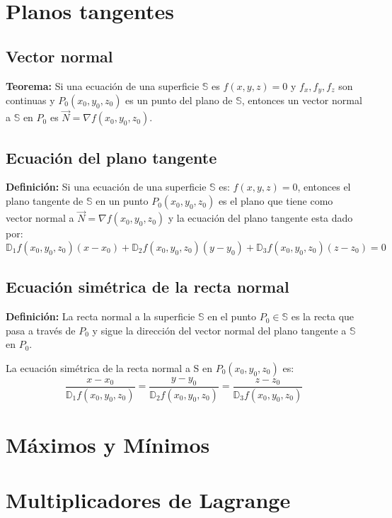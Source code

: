 \documentclass[../main]{subfiles}
\begin{document}
\chapter{Planos tangentes}
\section{Vector normal}
\textbf{Teorema:} Si una ecuación de una superficie $\mathbb{S}$ es $f(x,y,z)=0$ y $f_x,f_y,f_z$ son continuas y $P_0 (x_0,y_0,z_0)$ es un punto del plano de $\mathbb{S}$, entonces un vector normal a $\mathbb{S}$ en $P_0$ es $\vec{N}= \nabla f(x_0,y_0,z_0)$.
\section{Ecuación del plano tangente}
\textbf{Definición:} Si una ecuación de una superficie $\mathbb{S}$ es: $f(x,y,z)=0$, entonces el plano tangente de $\mathbb{S}$ en un punto $P_0 (x_0,y_0,z_0)$ es el plano que tiene como vector normal a $\vec{N}=\nabla f(x_0,y_0,z_0)$ y la ecuación del plano tangente esta dado por:
\begin{equation}
    \mathbb{D}_1 f(x_0,y_0,z_0)(x-x_0)+\mathbb{D}_2 f(x_0,y_0,z_0)(y-y_0)+\mathbb{D}_3 f(x_0,y_0,z_0)(z-z_0)=0
\end{equation}
\section{Ecuación simétrica de la recta normal}
\textbf{Definición:} La recta normal a la superficie $\mathbb{S}$ en el punto $P_0 \in \mathbb{S}$ es la recta que pasa a través de $P_0$ y sigue la dirección del vector normal del plano tangente a $\mathbb{S}$ en $P_0$.

La ecuación simétrica de la recta normal a S en $P_0(x_0,y_0,z_0)$ es:
\begin{equation}
    \dfrac{x-x_0}{\mathbb{D}_1 f(x_0,y_0,z_0)}=\dfrac{y-y_0}{\mathbb{D}_2 f(x_0,y_0,z_0)}=\dfrac{z-z_0}{\mathbb{D}_3 f(x_0,y_0,z_0)}
\end{equation}
\chapter{Máximos y Mínimos}

\chapter{Multiplicadores de Lagrange}
\end{document}
